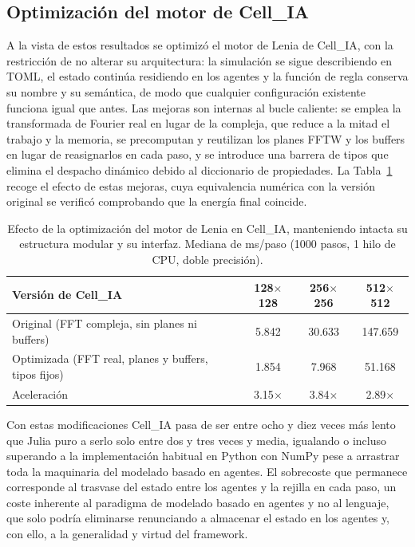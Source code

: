 \documentclass[runningheads]{llncs}
\begin{document}
\subsection{Optimización del motor de Cell\_IA}
\label{sec:optimizacion_cellia}
A la vista de estos resultados se optimizó el motor de Lenia de Cell\_IA, con la restricción de no alterar su arquitectura: la simulación se sigue describiendo en TOML, el estado continúa residiendo en los agentes y la función de regla conserva su nombre y su semántica, de modo que cualquier configuración existente funciona igual que antes. Las mejoras son internas al bucle caliente: se emplea la transformada de Fourier real en lugar de la compleja, que reduce a la mitad el trabajo y la memoria, se precomputan y reutilizan los planes FFTW y los buffers en lugar de reasignarlos en cada paso, y se introduce una barrera de tipos que elimina el despacho dinámico debido al diccionario de propiedades. La Tabla~\ref{tab:optimizacion_cellia} recoge el efecto de estas mejoras, cuya equivalencia numérica con la versión original se verificó comprobando que la energía final coincide.

\begin{table}[H]
\centering
\caption{Efecto de la optimización del motor de Lenia en Cell\_IA, manteniendo intacta su estructura modular y su interfaz. Mediana de ms/paso (1000 pasos, 1 hilo de CPU, doble precisión).}
\label{tab:optimizacion_cellia}
\begin{tabular}{@{}lccc@{}}
\toprule
\textbf{Versión de Cell\_IA} & \textbf{128$\times$128} & \textbf{256$\times$256} & \textbf{512$\times$512} \\ \midrule
Original (FFT compleja, sin planes ni buffers)        & 5.842 & 30.633 & 147.659 \\
Optimizada (FFT real, planes y buffers, tipos fijos)  & 1.854 & 7.968  & 51.168  \\ \midrule
Aceleración                                           & 3.15$\times$ & 3.84$\times$ & 2.89$\times$ \\ \bottomrule
\end{tabular}
\end{table}

Con estas modificaciones Cell\_IA pasa de ser entre ocho y diez veces más lento que Julia puro a serlo solo entre dos y tres veces y media, igualando o incluso superando a la implementación habitual en Python con NumPy pese a arrastrar toda la maquinaria del modelado basado en agentes. El sobrecoste que permanece corresponde al trasvase del estado entre los agentes y la rejilla en cada paso, un coste inherente al paradigma de modelado basado en agentes y no al lenguaje, que solo podría eliminarse renunciando a almacenar el estado en los agentes y, con ello, a la generalidad y virtud del framework.
\end{document}
